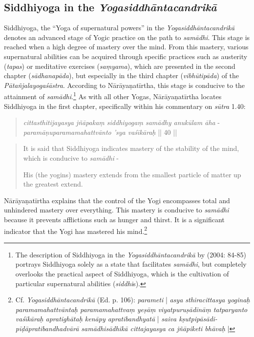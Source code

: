 \subsection{Siddhiyoga in the \textit{Yogasiddhāntacandrikā}}

Siddhiyoga, the ``Yoga of supernatural powers'' in the \textit{Yogasiddhāntacandrikā} denotes an advanced stage of Yogic practice on the path to \textit{samādhi}. This stage is reached when a high degree of mastery over the mind. From this mastery, various supernatural abilities can be acquired through specific practices such as austerity (\textit{tapas}) or meditative exercises (\textit{saṃyama}), which are presented in the second chapter (\textit{sādhanapāda}), but especially in the third chapter (\textit{vibhūtipāda}) of the \textit{Pātañjalayogaśāstra}. According to Nārāyaṇatīrtha, this stage is conducive to the attainment of \textit{samādhi}.\footnote{The description of Siddhiyoga in the \textit{Yogasiddhāntacandrikā} by \citeauthor{penna2004} (2004: 84-85) portrays Siddhiyoga solely as a state that facilitates \textit{samādhi}, but completely overlooks the practical aspect of Siddhiyoga, which is the cultivation of particular supernatural abilities (\textit{siddhi}s).}
As with all other Yogas, Nārāyaṇatīrtha locates Siddhiyoga in the first chapter, specifically within his commentary on \textit{sūtra} 1.40:

\begin{quote}
  \textit{cittasthitijayasya jñāpakaṃ siddhiyogaṃ samādhy anukūlam āha} -\\
\textit{paramāṇuparamamahattvānto 'sya vaśīkāraḥ} || 40 ||
\end{quote}
\begin{quote}
It is said that Siddhiyoga indicates mastery of the stability of the mind, which is conducive to \textit{samādhi} -

His (the yogins) mastery extends from the smallest particle of matter up the greatest extend. \end{quote}

Nārāyaṇatīrtha explains that the control of the Yogi encompasses total and unhindered mastery over everything. This mastery is conducive to \textit{samādhi} because it prevents afflictions such as hunger and thirst. It is a significant indicator that the Yogi has mastered his mind.\footnote{Cf. \textit{Yogasiddhāntacandrikā} (Ed. p. 106): \textit{parameti} | \textit{asya sthiracittasya yoginaḥ paramamahattvāntaḥ paramamahattvaṃ yeṣāṃ viyatpuruṣādīnāṃ tatparyanto vaśīkāraḥ apratighātaḥ kenāpy apratibandhyatā} | \textit{saiva kṣutpipāsādi- pīḍāpratibandhadvārā samādhisādhikā cittajayasya ca jñāpiketi bhāvaḥ} |}

